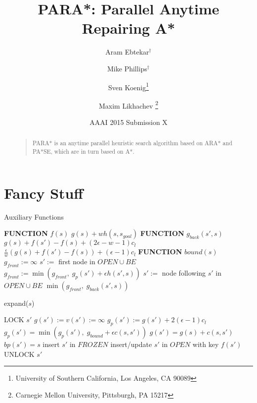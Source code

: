 \documentclass[letterpaper]{article}
\begin{document}
%
\title{PARA*: Parallel Anytime Repairing A*}
\author{Aram Ebtekar$^\dagger$ \and Mike Phillips$^\dagger$ \and Sven Koenig\thanks{University of Southern California, Los Angeles, CA 90089} \and Maxim Likhachev%
\thanks{Carnegie Mellon University, Pittsburgh, PA 15217}%
%
}
\author{AAAI 2015 Submission X}%
\maketitle
\begin{abstract}
\begin{quote}
PARA* is an anytime parallel heuristic search algorithm based on ARA* and PA*SE, which are in turn based on A*.
\end{quote}
\end{abstract}

\section{Fancy Stuff}

\begin{algorithm}
\caption{Auxiliary Functions}
\label{alg:aux}
\begin{algorithmic}
\STATE \textbf{FUNCTION} $f(s)$
\RETURN $g(s) + wh(s,s_{goal})$
\STATE \textbf{FUNCTION} $g_{back}(s',s)$
\RETURN $g(s) + f(s') - f(s) + (2\epsilon-w-1)c_l$
\ELSE
\RETURN $\frac\epsilon w\left(g(s) + f(s') - f(s)\right) + (\epsilon-1)c_l$
\ENDIF
\STATE \textbf{FUNCTION} $bound(s)$
\STATE $g_{front} := \infty$
\STATE $s' :=$ first node in $OPEN \cup BE$
\STATE $g_{front} := \min(g_{front},\;g_p(s') + \epsilon h(s',s))$
\STATE $s' :=$ node following $s'$ in $OPEN \cup BE$
\ENDWHILE
\RETURN $\min(g_{front},\;g_{back}(s',s))$
\end{algorithmic}
\end{algorithm}

\begin{algorithm}
\caption{expand($s$)}
\label{alg:expand}
\begin{algorithmic}
\STATE LOCK $s'$
\STATE $g(s') := v(s') := \infty$
\ENDIF
\STATE $g_p(s') := g(s') + 2(\epsilon-1)c_l$
\ENDIF
\STATE $g_p(s') = \min(g_p(s'),\; g_{bound} + \epsilon c(s,s'))$
\STATE $g(s') = g(s) + c(s,s')$
\STATE $bp(s') = s$
\STATE insert $s'$ in $FROZEN$
\ELSE
\STATE insert/update $s'$ in $OPEN$ with key $f(s')$
\ENDIF
\ENDIF
\STATE UNLOCK $s'$
\ENDFOR

\end{algorithmic}
\end{algorithm}
\end{document}
